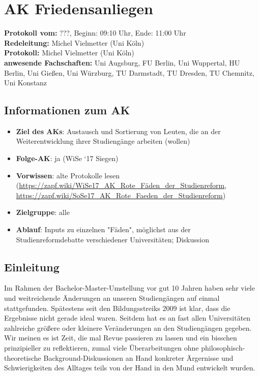 
\section{AK Friedensanliegen}

	\textbf{Protokoll vom:} ???,
	Beginn: 09:10 Uhr,
	Ende: 11:00 Uhr \\
	\textbf{Redeleitung:} Michel Vielmetter (Uni Köln) \\
	\textbf{Protokoll:} Michel Vielmetter (Uni Köln) \\
	\textbf{anwesende Fachschaften:} Uni Augsburg, FU Berlin, Uni Wuppertal, HU Berlin, Uni Gießen, Uni Würzburg, TU Darmstadt, TU Dresden, TU Chemnitz, Uni Konstanz

	\subsection*{Informationen zum AK}
		\begin{itemize}
			\item \textbf{Ziel des AKs}: Austausch und Sortierung von Leuten, die an der Weiterentwicklung ihrer Studiengänge arbeiten (wollen)
			\item \textbf{Folge-AK}: ja (WiSe `17 Siegen)
			\item \textbf{Vorwissen}: alte Protokolle lesen (\url{https://zapf.wiki/WiSe17_AK_Rote_Fäden_der_Studienreform}, \url{https://zapf.wiki/SoSe17_AK_Rote_Faeden_der_Studienreform})
			\item \textbf{Zielgruppe}: alle
			\item \textbf{Ablauf}: Inputs zu einzelnen "Fäden", möglichst aus der Studienreformdebatte verschiedener Universitäten; Diskussion
		\end{itemize}

  \subsection{Einleitung}
    Im Rahmen der Bachelor-Master-Umstellung vor gut 10 Jahren haben sehr viele und weitreichende Änderungen an unseren Studiengängen auf einmal stattgefunden. Spätestens seit den Bildungsstreiks 2009 ist klar, dass die Ergebnisse nicht gerade ideal waren. Seitdem hat es an fast allen Universitäten zahlreiche größere oder kleinere Veränderungen an den Studiengängen gegeben. Wir meinen es ist Zeit, die mal Revue passieren zu lassen und ein bisschen prinzipieller zu reflektieren, zumal viele Überarbeitungen ohne philosophisch-theoretische Background-Diskussionen an Hand konkreter Ärgernisse und Schwierigkeiten des Alltages teils von der Hand in den Mund entwickelt wurden. \\ %

